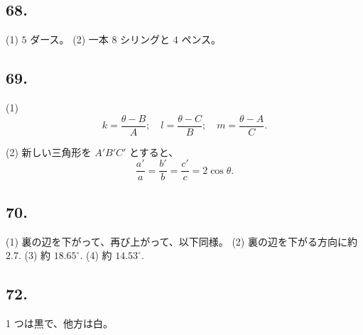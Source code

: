 \subsection*{68.}

(1) $5$ ダース。
(2) 一本 $8$ シリングと $4$ ペンス。


\subsection*{69.}

(1)
\[
k = \frac{\theta - B}{A}; \quad l = \frac{\theta - C}{B};
\quad m = \frac{\theta - A}{C}.
\]


(2)
新しい三角形を $A'B'C'$ とすると、
\[
\frac{a'}{a} = \frac{b'}{b} = \frac{c'}{c} = 2 \cos \theta.
\]


\subsection*{70.}

(1)
裏の辺を下がって、再び上がって、以下同様。
(2)
裏の辺を下がる方向に約 $2.7$.
(3)
約 $18.65^\circ$.
(4)
約 $14.53^\circ$.


\subsection*{72.}

 1 つは黒で、他方は白。

